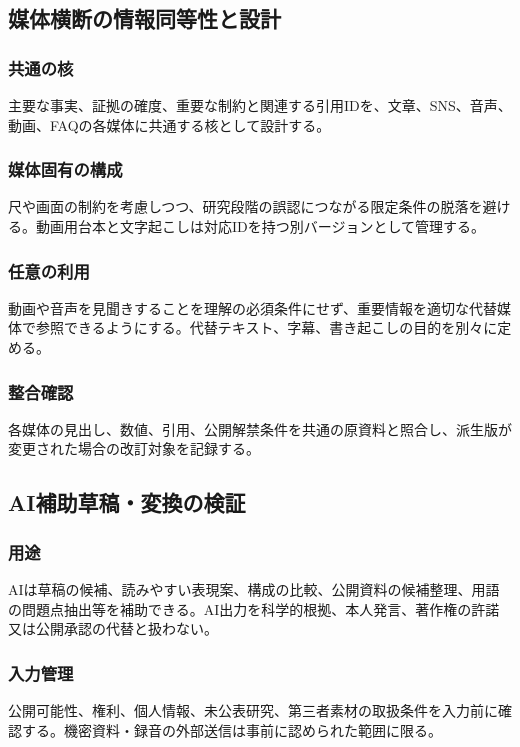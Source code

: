 \documentclass[a4paper,11pt]{article}
\begin{document}
\subsection{媒体横断の情報同等性と設計}
\subsubsection{共通の核}
\par 主要な事実、証拠の確度、重要な制約と関連する引用IDを、文章、SNS、音声、動画、FAQの各媒体に共通する核として設計する。\par\medskip
\subsubsection{媒体固有の構成}
\par 尺や画面の制約を考慮しつつ、研究段階の誤認につながる限定条件の脱落を避ける。動画用台本と文字起こしは対応IDを持つ別バージョンとして管理する。\par\medskip
\subsubsection{任意の利用}
\par 動画や音声を見聞きすることを理解の必須条件にせず、重要情報を適切な代替媒体で参照できるようにする。代替テキスト、字幕、書き起こしの目的を別々に定める。\par\medskip
\subsubsection{整合確認}
\par 各媒体の見出し、数値、引用、公開解禁条件を共通の原資料と照合し、派生版が変更された場合の改訂対象を記録する。\par\medskip
\subsection{AI補助草稿・変換の検証}
\subsubsection{用途}
\par AIは草稿の候補、読みやすい表現案、構成の比較、公開資料の候補整理、用語の問題点抽出等を補助できる。AI出力を科学的根拠、本人発言、著作権の許諾又は公開承認の代替と扱わない。\par\medskip
\subsubsection{入力管理}
\par 公開可能性、権利、個人情報、未公表研究、第三者素材の取扱条件を入力前に確認する。機密資料・録音の外部送信は事前に認められた範囲に限る。\par\medskip
\end{document}
